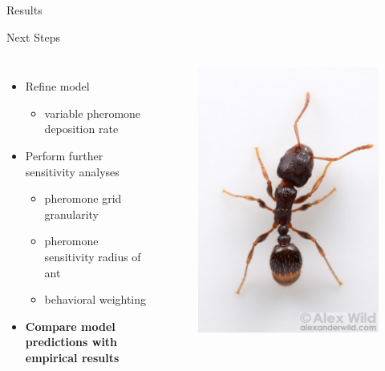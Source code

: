\begin{section}{Results}
\begin{frame}{Next Steps}
\begin{columns}[T,onlytextwidth]
\begin{itemize}
\item Refine model
	\begin{itemize}
		\item variable pheromone deposition rate
	\end{itemize}
\item Perform further sensitivity analyses
	\begin{itemize}
		\item pheromone grid granularity
        \item pheromone sensitivity radius of ant
        \item behavioral weighting
	\end{itemize}
\item \textbf{Compare model predictions with empirical results}
\end{itemize}
\begin{figure}
        \includegraphics[width=\textwidth]{images/spE2-XL}

\end{figure}
\end{columns}
\end{frame}
\end{section}
